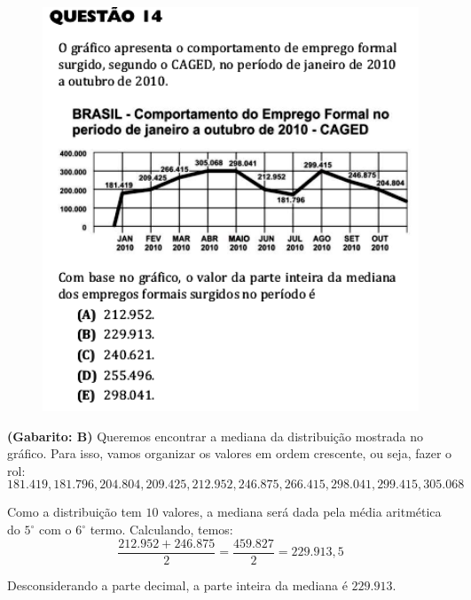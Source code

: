 \documentclass[a4paper]{article}
\begin{document}
\begin{figure}[H]
	\begin{center}
		\includegraphics[width=12cm]{L1Q14.png}
	\end{center}
\end{figure}
\par\textbf{(Gabarito: B)} Queremos encontrar a mediana da distribuição mostrada no gráfico. Para isso, vamos organizar os valores em ordem crescente, ou seja, fazer o rol:
\begin{equation*}
181.419, 181.796, 204.804, 209.425, 212.952, 246.875, 266.415, 298.041, 299.415, 305.068
\end{equation*}
\par\vspace{0.3cm} Como a distribuição tem $10$ valores, a mediana será dada pela média aritmética do $5^\circ$ com o $6^\circ$ termo. Calculando, temos:
\begin{equation*}
\frac{212.952 + 246.875}{2} = \frac{459.827}{2} = 229.913,5
\end{equation*}
\par\vspace{0.3cm} Desconsiderando a parte decimal, a parte inteira da mediana é $229.913$.
\end{document}
